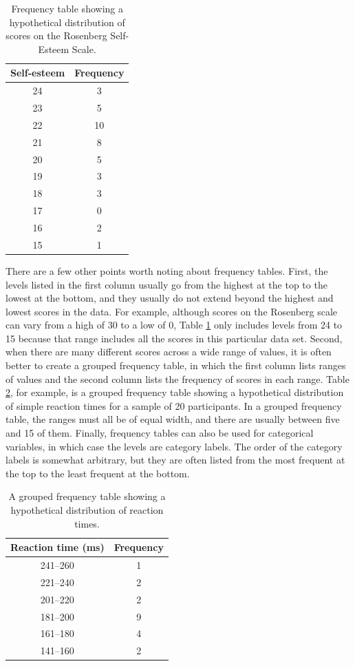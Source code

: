 \documentclass[
]{krantz}
\begin{document}
\begin{table}

\caption{\label{tab:frequency}Frequency table showing a hypothetical distribution of scores on the Rosenberg Self-Esteem Scale.}
\centering
\begin{tabular}[t]{c|c}
\hline
Self-esteem & Frequency\\
\hline
24 & 3\\
\hline
23 & 5\\
\hline
22 & 10\\
\hline
21 & 8\\
\hline
20 & 5\\
\hline
19 & 3\\
\hline
18 & 3\\
\hline
17 & 0\\
\hline
16 & 2\\
\hline
15 & 1\\
\hline
\end{tabular}
\end{table}

There are a few other points worth noting about frequency tables. First, the levels listed in the first column usually go from the highest at the top to the lowest at the bottom, and they usually do not extend beyond the highest and lowest scores in the data. For example, although scores on the Rosenberg scale can vary from a high of 30 to a low of 0, Table \ref{tab:frequency} only includes levels from 24 to 15 because that range includes all the scores in this particular data set. Second, when there are many different scores across a wide range of values, it is often better to create a grouped frequency table, in which the first column lists ranges of values and the second column lists the frequency of scores in each range. Table \ref{tab:frequencybin}, for example, is a grouped frequency table showing a hypothetical distribution of simple reaction times for a sample of 20 participants. In a grouped frequency table, the ranges must all be of equal width, and there are usually between five and 15 of them. Finally, frequency tables can also be used for categorical variables, in which case the levels are category labels. The order of the category labels is somewhat arbitrary, but they are often listed from the most frequent at the top to the least frequent at the bottom.

\begin{table}

\caption{\label{tab:frequencybin}A grouped frequency table showing a hypothetical distribution of reaction times.}
\centering
\begin{tabular}[t]{c|c}
\hline
Reaction time (ms) & Frequency\\
\hline
241–260 & 1\\
\hline
221–240 & 2\\
\hline
201–220 & 2\\
\hline
181–200 & 9\\
\hline
161–180 & 4\\
\hline
141–160 & 2\\
\hline
\end{tabular}
\end{table}
\end{document}
